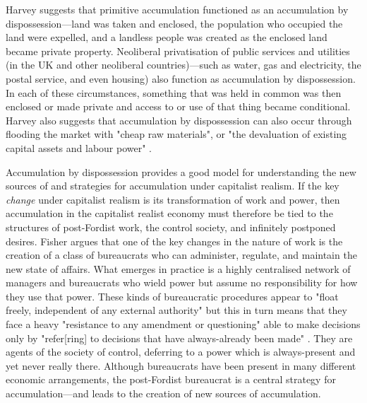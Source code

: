 Harvey suggests that primitive accumulation functioned as an accumulation by dispossession—land was taken and enclosed, the population who occupied the land were expelled, and a landless people was created as the enclosed land became private property. Neoliberal privatisation of public services and utilities (in the UK and other neoliberal countries)—such as water, gas and electricity, the postal service, and even housing) also function as accumulation by dispossession. In each of these circumstances, something that was held in common was then enclosed or made private and access to or use of that thing became conditional. Harvey also suggests that accumulation by dispossession can also occur through flooding the market with "cheap raw materials", or "the devaluation of existing capital assets and labour power" \citep[p. 150]{harvey_new_2003}.

Accumulation by dispossession provides a good model for understanding the new sources of and strategies for accumulation under capitalist realism. If the key \emph{change} under capitalist realism is its transformation of work and power, then accumulation in the capitalist realist economy must therefore be tied to the structures of post-Fordist work, the control society, and infinitely postponed desires. Fisher argues that one of the key changes in the nature of work is the creation of a class of bureaucrats who can administer, regulate, and maintain the new state of affairs. What emerges in practice is a highly centralised network of managers and bureaucrats who wield power but assume no responsibility for how they use that power. These kinds of bureaucratic procedures appear to "float freely, independent of any external authority" but this in turn means that they face a heavy "resistance to any amendment or questioning" \citep[p. 55]{fisher_capitalist_2009} able to make decisions only by "refer[ring] to decisions that have always-already been made" \citep[p. 53]{fisher_capitalist_2009}. They are agents of the society of control, deferring to a power which is always-present and yet never really there. Although bureaucrats have been present in many different economic arrangements, the post-Fordist bureaucrat is a central strategy for accumulation—and leads to the creation of new sources of accumulation.

